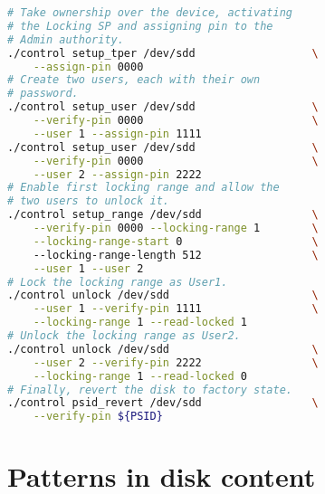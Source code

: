 



\begin{lstlisting}[language=bash,caption=Workflow,label={lst:control_workflow}]
# Take ownership over the device, activating 
# the Locking SP and assigning pin to the 
# Admin authority.
./control setup_tper /dev/sdd                  \
    --assign-pin 0000
# Create two users, each with their own
# password.
./control setup_user /dev/sdd                  \
    --verify-pin 0000                          \
    --user 1 --assign-pin 1111
./control setup_user /dev/sdd                  \
    --verify-pin 0000                          \
    --user 2 --assign-pin 2222
# Enable first locking range and allow the 
# two users to unlock it.
./control setup_range /dev/sdd                 \
    --verify-pin 0000 --locking-range 1        \
    --locking-range-start 0                    \ 
    --locking-range-length 512                 \
    --user 1 --user 2
# Lock the locking range as User1.
./control unlock /dev/sdd                      \
    --user 1 --verify-pin 1111                 \
    --locking-range 1 --read-locked 1
# Unlock the locking range as User2.
./control unlock /dev/sdd                      \
    --user 2 --verify-pin 2222                 \
    --locking-range 1 --read-locked 0
# Finally, revert the disk to factory state.
./control psid_revert /dev/sdd                 \
    --verify-pin ${PSID}
\end{lstlisting}

\chapter{Patterns in disk content}
\label{appendix:rng_pattern}

